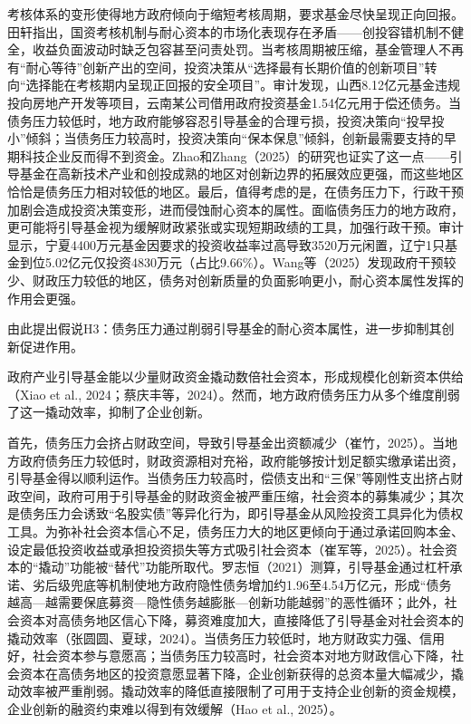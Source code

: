 考核体系的变形使得地方政府倾向于缩短考核周期，要求基金尽快呈现正向回报。田轩指出，国资考核机制与耐心资本的市场化表现存在矛盾——创投容错机制不健全，收益负面波动时缺乏包容甚至问责处罚。当考核周期被压缩，基金管理人不再有“耐心等待”创新产出的空间，投资决策从“选择最有长期价值的创新项目”转向“选择能在考核期内呈现正回报的安全项目”。审计发现，山西8.12亿元基金违规投向房地产开发等项目，云南某公司借用政府投资基金1.54亿元用于偿还债务。当债务压力较低时，地方政府能够容忍引导基金的合理亏损，投资决策向“投早投小”倾斜；当债务压力较高时，投资决策向“保本保息”倾斜，创新最需要支持的早期科技企业反而得不到资金。Zhao和Zhang（2025）的研究也证实了这一点——引导基金在高新技术产业和创投成熟的地区对创新边界的拓展效应更强，而这些地区恰恰是债务压力相对较低的地区。最后，值得考虑的是，在债务压力下，行政干预加剧会造成投资决策变形，进而侵蚀耐心资本的属性。面临债务压力的地方政府，更可能将引导基金视为缓解财政紧张或实现短期政绩的工具，加强行政干预。审计显示，宁夏4400万元基金因要求的投资收益率过高导致3520万元闲置，辽宁1只基金到位5.02亿元仅投资4830万元（占比9.66\%）。Wang等（2025）发现政府干预较少、财政压力较低的地区，债务对创新质量的负面影响更小，耐心资本属性发挥的作用会更强。

由此提出假说H3：债务压力通过削弱引导基金的耐心资本属性，进一步抑制其创新促进作用。

政府产业引导基金能以少量财政资金撬动数倍社会资本，形成规模化创新资本供给（Xiao et al., 2024；蔡庆丰等，2024）。然而，地方政府债务压力从多个维度削弱了这一撬动效率，抑制了企业创新。

首先，债务压力会挤占财政空间，导致引导基金出资额减少（崔竹，2025）。当地方政府债务压力较低时，财政资源相对充裕，政府能够按计划足额实缴承诺出资，引导基金得以顺利运作。当债务压力较高时，偿债支出和“三保”等刚性支出挤占财政空间，政府可用于引导基金的财政资金被严重压缩，社会资本的募集减少；其次是债务压力会诱致“名股实债”等异化行为，即引导基金从风险投资工具异化为债权工具。为弥补社会资本信心不足，债务压力大的地区更倾向于通过承诺回购本金、设定最低投资收益或承担投资损失等方式吸引社会资本（崔军等，2025）。社会资本的“撬动”功能被“替代”功能所取代。罗志恒（2021）测算，引导基金通过杠杆承诺、劣后级兜底等机制使地方政府隐性债务增加约1.96至4.54万亿元，形成“债务越高—越需要保底募资—隐性债务越膨胀—创新功能越弱”的恶性循环；此外，社会资本对高债务地区信心下降，募资难度加大，直接降低了引导基金对社会资本的撬动效率（张圆圆、夏球，2024）。当债务压力较低时，地方财政实力强、信用好，社会资本参与意愿高；当债务压力较高时，社会资本对地方财政信心下降，社会资本在高债务地区的投资意愿显著下降，企业创新获得的总资本量大幅减少，撬动效率被严重削弱。撬动效率的降低直接限制了可用于支持企业创新的资金规模，企业创新的融资约束难以得到有效缓解（Hao et al., 2025）。

